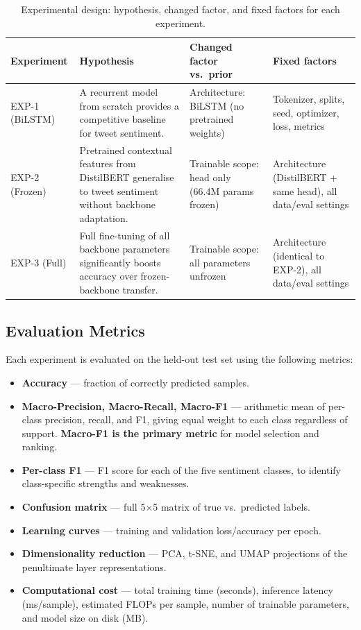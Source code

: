 \begin{table}[H]
    \centering
    \caption{Experimental design: hypothesis, changed factor, and fixed factors for each experiment.}
    \label{tab:exp_design}
    \begin{tabularx}{\textwidth}{l X X X}
        \toprule
        \textbf{Experiment} & \textbf{Hypothesis} & \textbf{Changed factor vs.\ prior} & \textbf{Fixed factors} \\
        \midrule
        EXP-1 (BiLSTM)
            & A recurrent model from scratch provides a competitive baseline for tweet sentiment.
            & Architecture: BiLSTM (no pretrained weights)
            & Tokenizer, splits, seed, optimizer, loss, metrics \\
        \addlinespace
        EXP-2 (Frozen)
            & Pretrained contextual features from DistilBERT generalise to tweet sentiment without backbone adaptation.
            & Trainable scope: head only (66.4M params frozen)
            & Architecture (DistilBERT + same head), all data/eval settings \\
        \addlinespace
        EXP-3 (Full)
            & Full fine-tuning of all backbone parameters significantly boosts accuracy over frozen-backbone transfer.
            & Trainable scope: all parameters unfrozen
            & Architecture (identical to EXP-2), all data/eval settings \\
        \bottomrule
    \end{tabularx}
\end{table}

\subsection{Evaluation Metrics}

Each experiment is evaluated on the held-out test set using the following metrics:

\begin{itemize}
    \item \textbf{Accuracy} — fraction of correctly predicted samples.
    \item \textbf{Macro-Precision, Macro-Recall, Macro-F1} — arithmetic mean of per-class precision, recall, and F1, giving equal weight to each class regardless of support. \textbf{Macro-F1 is the primary metric} for model selection and ranking.
    \item \textbf{Per-class F1} — F1 score for each of the five sentiment classes, to identify class-specific strengths and weaknesses.
    \item \textbf{Confusion matrix} — full 5×5 matrix of true vs.\ predicted labels.
    \item \textbf{Learning curves} — training and validation loss/accuracy per epoch.
    \item \textbf{Dimensionality reduction} — PCA, t-SNE, and UMAP projections of the penultimate layer representations.
    \item \textbf{Computational cost} — total training time (seconds), inference latency (ms/sample), estimated FLOPs per sample, number of trainable parameters, and model size on disk (MB).
\end{itemize}
